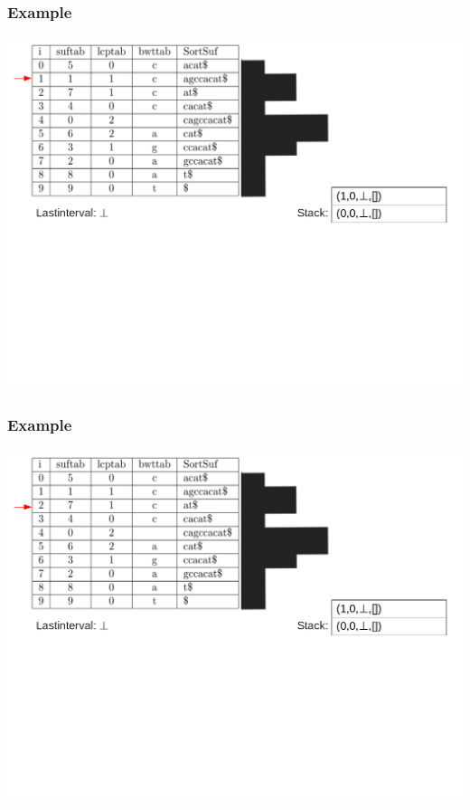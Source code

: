 \documentclass[compress,handout]{beamer} %
\begin{document}
\begin{frame}
	\frametitle{Example}
	\includegraphics[width=\textwidth, height=\textheight, keepaspectratio=true]{traversal_2}
\end{frame}

\begin{frame}
	\frametitle{Example}
	\includegraphics[width=\textwidth, height=\textheight, keepaspectratio=true]{traversal_3}
\end{frame}
\end{document}
